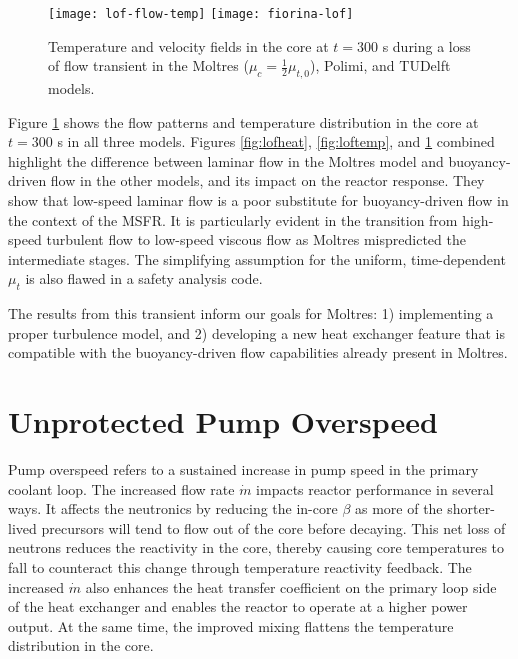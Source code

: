 \begin{figure}[htbp!]
    \centering
    \texttt{[image: lof-flow-temp]}
    \texttt{[image: fiorina-lof]}
    \caption{Temperature and velocity fields in the core at $t=300$ s during
    a loss of flow transient in the Moltres ($\mu_c = \frac{1}{2} \mu_{t,0}$),
    Polimi, and TUDelft models.}
    \label{fig:lofflowtemp}
\end{figure}

Figure \ref{fig:lofflowtemp} shows the flow patterns and temperature
distribution in the core at $t=300$ s in all three models. Figures
\ref{fig:lofheat}, \ref{fig:loftemp}, and \ref{fig:lofflowtemp} combined
highlight the difference between laminar flow in the Moltres model and
buoyancy-driven flow in the other models, and its impact on the reactor
response. They show that low-speed laminar flow is a poor substitute for
buoyancy-driven flow in the context of the MSFR. It is particularly evident
in the transition from high-speed turbulent flow to low-speed viscous
flow as Moltres mispredicted the intermediate stages. The
simplifying assumption for the uniform, time-dependent $\mu_t$ is also flawed
in a safety analysis code.

The results from this transient inform our goals for Moltres: 1)
implementing a proper turbulence model, and
2) developing a new heat exchanger feature that is compatible with the
buoyancy-driven flow capabilities already present in Moltres.

\clearpage

\section{Unprotected Pump Overspeed}

Pump overspeed refers to a sustained
increase in pump speed in the primary coolant loop. The increased flow rate
$\dot{m}$ impacts reactor performance in several ways.
It affects the neutronics by reducing the in-core $\beta$ as more of the
shorter-lived precursors will tend to flow out of the core before decaying.
This net loss of neutrons reduces the reactivity in the core, thereby causing
core temperatures to fall to counteract this change through temperature
reactivity feedback. The increased $\dot{m}$ also enhances the heat transfer
coefficient on the primary loop side of the heat exchanger and enables the
reactor to operate at a higher power output. At the same time, the improved
mixing flattens the temperature distribution in the core.

